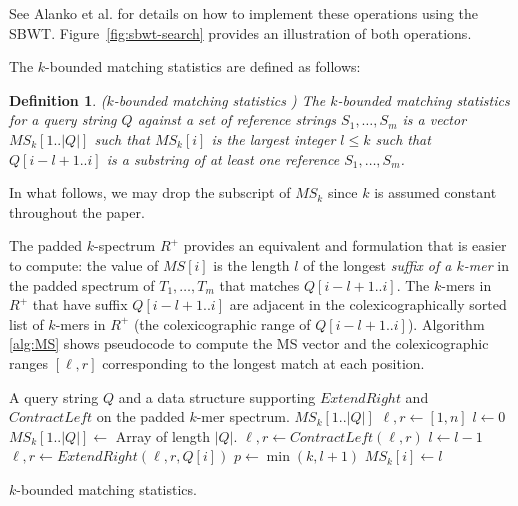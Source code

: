 \documentclass[unnumsec,webpdf,contemporary,large]{oup-authoring-template}%
\theoremstyle{thmstyleone}%
\theoremstyle{thmstyletwo}%
\theoremstyle{thmstylethree}%
\newtheorem{definition}{Definition}
\begin{document}
See Alanko et al. \cite{alanko2024finimizers} for details on how to implement these operations using the SBWT. Figure~\ref{fig:sbwt-search} provides an illustration of both operations.


The $k$-bounded matching statistics are defined as follows:

\begin{definition}\label{def:k-bounded-ms}
    ($k$-bounded matching statistics \cite{alanko2024finimizers})
    The $k$-bounded matching statistics for a query string $Q$ against a set of reference strings $S_1, \ldots, S_m$ is a vector $MS_k[1..|Q|]$ such that $MS_k[i]$ is the largest integer $l \leq k$ such that $Q[i-l+1..i]$ %
    is a substring of at least one reference $S_1, \ldots, S_m$.
\end{definition}

In what follows, we may drop the subscript of $MS_k$ since $k$ is assumed constant throughout the paper.

The padded $k$-spectrum $R^+$ provides an equivalent and formulation that is easier to compute: the value of $MS[i]$ is the length $l$ of the longest \emph{suffix of a $k$-mer} in the padded spectrum of $T_1, \ldots, T_m$ that matches $Q[i-l+1..i]$. The $k$-mers in $R^+$ that have suffix $Q[i-l+1..i]$ are adjacent in the colexicographically sorted list of $k$-mers in $R^+$ (the colexicographic range of $Q[i-l+1..i]$). Algorithm \ref{alg:MS} shows pseudocode to compute the MS vector and the colexicographic ranges $[\ell, r]$ corresponding to the longest match at each position.

\begin{algorithm}
\begin{algorithmic}[1]
\small
\Require A query string $Q$ and a data structure supporting $ExtendRight$ and $ContractLeft$ on the padded $k$-mer spectrum. %
\Ensure $MS_k[1..|Q|]$
\State $\ell, r \gets [1,n]$ 
\State $l \gets 0$ 
\State $MS_k[1..|Q|] \gets $ Array of length $|Q|$.
\label{line:MS-1-start}
    \State $\ell, r \gets ContractLeft(\ell, r)$
    \State $l \gets l-1$
\EndWhile \label{line:MS-1-end}
    \State $\ell, r \gets ExtendRight(\ell, r, Q[i])$\label{line:MS-2-start}
    \State $p \gets \min(k, l+1)$\label{line:MS-2-end}
\EndIf
\State $MS_k[i] \gets l$ %
\label{line:MS-4-assignment}
\EndFor
\caption{\small $k$-bounded matching statistics.} 
\label{alg:MS}
\end{algorithmic}
\end{algorithm}
\end{document}
